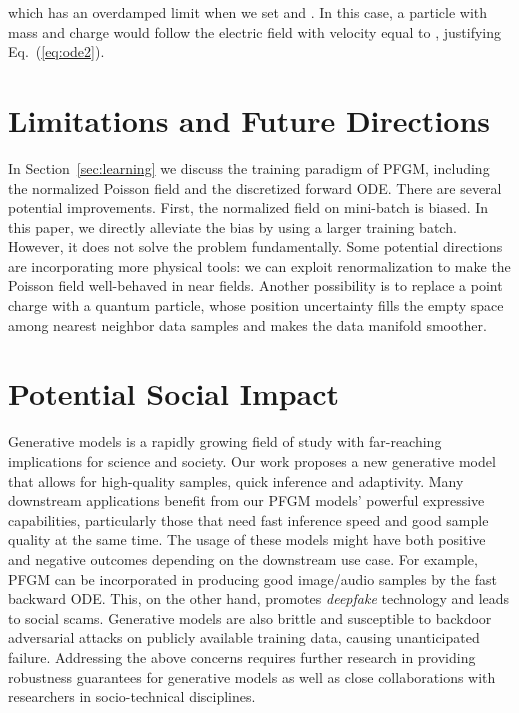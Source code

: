 {which has an overdamped limit   when we set  and . In this case, a particle with mass  and charge  would follow the electric field with velocity equal to , justifying Eq.~(\ref{eq:ode2}).}

\section{Limitations and Future Directions}
\label{app:limit}

In Section~\ref{sec:learning} we discuss the training paradigm of PFGM, including the normalized Poisson field and the discretized forward ODE. There are several potential improvements. First, the normalized field on mini-batch is biased. In this paper, we directly alleviate the bias by using a larger training batch. However, it does not solve the problem fundamentally. Some potential directions are incorporating more physical tools: we can exploit renormalization to make the Poisson field well-behaved in near fields. Another possibility is to replace a point charge with a quantum particle, whose position uncertainty fills the empty space among nearest neighbor data samples and makes the data manifold smoother. 


\section{Potential Social Impact}
\label{app:impact}

Generative models is a rapidly growing field of study with far-reaching implications for science and society. 
Our work proposes a new generative model that allows for high-quality samples, quick inference and adaptivity. Many downstream applications benefit from our PFGM models' powerful expressive capabilities, particularly those that need fast inference speed and good sample quality at the same time. The usage of these models might have both positive and negative outcomes depending on the downstream use case. 
For example, PFGM can be incorporated in producing good image/audio samples by the fast backward ODE. This, on the other hand, promotes \textit{deepfake} technology and leads to social scams. Generative models are also brittle and susceptible to backdoor adversarial attacks on publicly available training data, causing unanticipated failure.
Addressing the above concerns requires further research in providing robustness guarantees for generative models as well as close collaborations with researchers in socio-technical disciplines.




